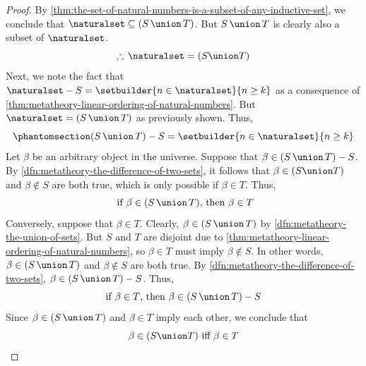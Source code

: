 \begin{proof}
    By \cref{thm:the-set-of-natural-numbers-is-a-subset-of-any-inductive-set}, we conclude that \( \naturalset \subseteq \mleft( S \,{\union}\, T \mright) \).
    But \( S \,{\union}\, T \) is clearly also a subset of \( \naturalset \).
    \begin{equation*}
        \therefore \, \naturalset = \mleft( S \union T \mright)
    \end{equation*}
    Next, we note the fact that \( \naturalset - S = \setbuilder{n \in \naturalset}{n \geq k} \) as a consequence of
    \cref{thm:metatheory-linear-ordering-of-natural-numbers}.
    But \( \naturalset = \mleft( S \,{\union}\, T \mright) \) as previously shown.
    Thus,
    \begin{equation}
        \phantomsection \label{eq:S-union-T-minus-S-equals-all-numbers-geq-k}
        \mleft( S \,{\union}\, T \mright) - S = \setbuilder{n \in \naturalset}{n \geq k}
    \end{equation}
    Let \( \beta \) be an arbitrary object in the universe.
    Suppose that \( \beta \in \mleft( S \,{\union}\, T \mright) - S \).
    By \cref{dfn:metatheory-the-difference-of-two-sets}, it follows that \( \beta \in \mleft( S \union T \mright) \) and \( \beta \notin S \) are both true, which
    is only possible if \( \beta \in T \). Thus,
    \begin{equation*}
        \text{ if  \( \beta \in \mleft( S \,{\union}\, T \mright) \), then \( \beta \in T \)}
    \end{equation*}
    Conversely, suppose that \( \beta \in T \).
    Clearly, \( \beta \in \mleft( S \,{\union}\, T \mright) \) by \cref{dfn:metatheory-the-union-of-sets}.
    But \( S \) and \( T \) are disjoint due to \cref{thm:metatheory-linear-ordering-of-natural-numbers}, so \( \beta \in T \) must imply
    \( \beta \notin S \). In other words, \( \beta \in \mleft( S \,{\union}\, T \mright) \) and \( \beta \notin S \) are both true.
    By \cref{dfn:metatheory-the-difference-of-two-sets}, \( \beta \in \mleft( S \,{\union}\, T \mright) - S \).
    Thus,
    \begin{equation*}
        \text{if \( \beta \in T \), then \( \beta \in \mleft( S \,{\union}\, T \mright) - S \)}
    \end{equation*}
    Since \( \beta \in \mleft( S \,{\union}\, T \mright) \) and \( \beta \in T \) imply each other, we conclude that
    \begin{equation*}
        \beta \in \mleft( S \union T \mright) \ \text{iff} \ \beta \in T
    \end{equation*}

\end{proof}
